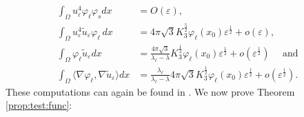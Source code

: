 \documentclass[10pt]{amsart}
\numberwithin{equation}{section}
\newcommand{\ve}{\varepsilon}
\newcommand{\vp}{\varphi}
\newcommand{\Om}{\Omega}
\theoremstyle{plain}
\theoremstyle{remark}
\begin{document}
\begin{equation} \label{label:unique}
\begin{aligned}
\int_{\Om} u_\ve^{4} \vp_\ell \vp_s dx & = O(\ve), \\
	\int_{\Om} u_{\ve}^{4}\tilde{u}_\ve \varphi_{\ell}\, dx& = 4 \pi \sqrt{3} K_3^{\frac{5}{2}}\vp_\ell(x_0) \ve^{\frac{1}{2}} + o(\ve), \\
\int_{\Om} \vp_\ell \tilde{u}_\ve dx &  = 
\frac{ 4 \pi \sqrt{3}}{\lambda_\ell-\lambda}K_3^{\frac{1}{2}}  \vp_{\ell}(x_0)  \ve^{\frac{1}{2}}+ o( \ve^{\frac{1}{2}}) \quad \text{ and } \\
\int_{\Om} \langle \nabla \vp_\ell, \nabla \tilde{u}_\ve \rangle dx & =   \frac{ \lambda_\ell}{\lambda_\ell-\lambda}4 \pi \sqrt{3} K_3^{\frac{1}{2}}  \vp_{\ell}(x_0)  \ve^{\frac{1}{2}}+ o( \ve^{\frac{1}{2}}). 
\end{aligned}
\end{equation}
These computations can again be found in \cite{EspositoPistoiaVetois, SchoenYamabe}. We now prove Theorem \ref{prop:test:func}:
\end{document}
